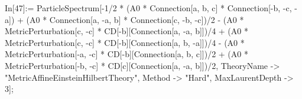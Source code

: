 In[47]:= ParticleSpectrum[-1/2 * (A0 * Connection[a, b, c] * Connection[-b, -c, -a]) + (A0 * Connection[a, -a, b] * Connection[c, -b, -c])/2 - (A0 * MetricPerturbation[c, -c] * CD[-b][Connection[a, -a, b]])/4 + (A0 * MetricPerturbation[c, -c] * CD[-b][Connection[a, b, -a]])/4 - (A0 * MetricPerturbation[-a, -c] * CD[-b][Connection[a, b, c]])/2 + (A0 * MetricPerturbation[-b, -c] * CD[c][Connection[a, -a, b]])/2, TheoryName -> "MetricAffineEinsteinHilbertTheory", Method -> "Hard", MaxLaurentDepth -> 3]; 